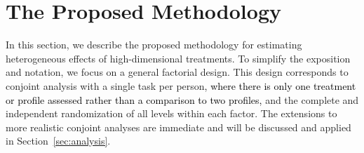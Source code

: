 




\section{The Proposed Methodology}\label{sec:methods}

In this section, we describe the proposed methodology for estimating
heterogeneous effects of high-dimensional treatments.  To simplify the
exposition and notation, we focus on a general factorial design.  This
design corresponds to conjoint analysis with a single task per person\textcolor{black}{, where there is only one treatment or profile assessed rather than a comparison to two profiles,}
and the complete and independent randomization of all levels within
each factor.  The extensions to more realistic conjoint analyses are
immediate and will be discussed and applied in
Section~\ref{sec:analysis}.  

